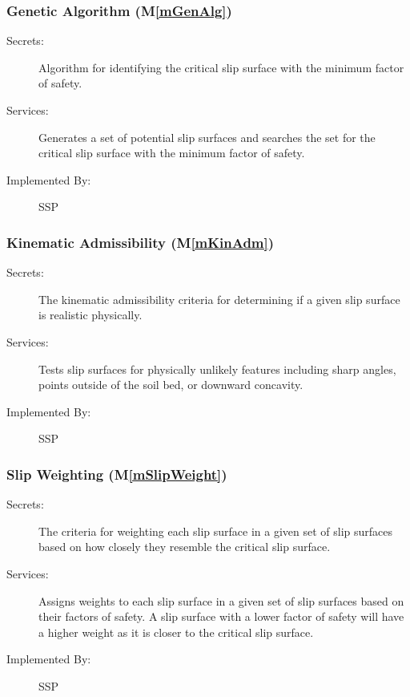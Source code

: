 \documentclass[12pt, titlepage]{article}
\newcommand{\progname}{SSP}
\newcommand{\mref}[1]{M\ref{#1}}
\begin{document}
\subsubsection{Genetic Algorithm (\mref{mGenAlg})}

\begin{description}
\item[Secrets:] Algorithm for identifying the critical slip surface with the 
minimum factor of safety.
\item[Services:] Generates a set of potential slip surfaces and searches the 
set for the critical slip surface with the minimum factor of safety.
\item[Implemented By:] \progname
\end{description}


\subsubsection{Kinematic Admissibility (\mref{mKinAdm})}

\begin{description}
\item[Secrets:] The kinematic admissibility criteria for determining if a given 
slip surface is realistic physically.
\item[Services:] Tests slip surfaces for physically unlikely features including 
sharp angles, points outside of the soil bed, or downward concavity.
\item[Implemented By:] \progname
\end{description} 

\subsubsection{Slip Weighting (\mref{mSlipWeight})}

\begin{description}
\item[Secrets:] The criteria for weighting each slip surface in a given set of 
slip surfaces based on how closely they resemble the critical slip surface.
\item[Services:] Assigns weights to each slip surface in a given set of slip 
surfaces based on their factors of safety. A slip surface with a lower factor 
of safety will have a higher weight as it is closer to the critical slip 
surface.
\item[Implemented By:] \progname
\end{description} 
\end{document}
